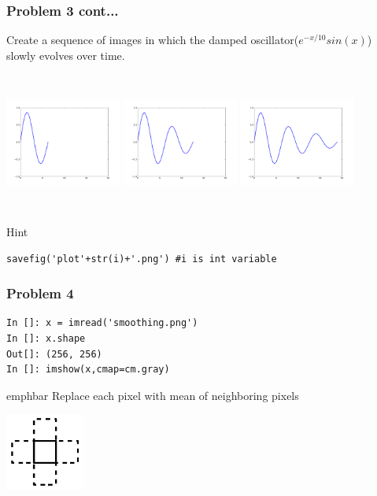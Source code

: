 \documentclass[14pt,compress]{beamer}
\newcommand{\emphbar}[1]
{\begin{beamercolorbox}[rounded=true]{emphbar} 
      {#1}
 \end{beamercolorbox}
}
\newcounter{time}
\begin{document}
\begin{frame}[fragile]
  \frametitle{Problem 3 cont...}
Create a sequence of images in which the damped oscillator($e^{-x/10}sin(x)$) slowly evolves over time.
\begin{columns}
\includegraphics[width=1.5in,height=1.5in, interpolate=true]{data/plot2}
\includegraphics[width=1.5in,height=1.5in, interpolate=true]{data/plot4}
\includegraphics[width=1.5in,height=1.5in, interpolate=true]{data/plot6}
\end{columns}
\begin{block}{Hint}
\small
  \begin{lstlisting}
savefig('plot'+str(i)+'.png') #i is int variable  
  \end{lstlisting}  
\end{block}
\end{frame}

\begin{frame}[fragile]
  \frametitle{Problem 4}
  \begin{lstlisting}
In []: x = imread('smoothing.png')
In []: x.shape
Out[]: (256, 256)
In []: imshow(x,cmap=cm.gray)
  \end{lstlisting}
\emphbar{Replace each pixel with mean of neighboring pixels}
  \begin{center}
  \includegraphics[height=1in, interpolate=true]{data/neighbour}
  \end{center}
\end{frame}
\end{document}
